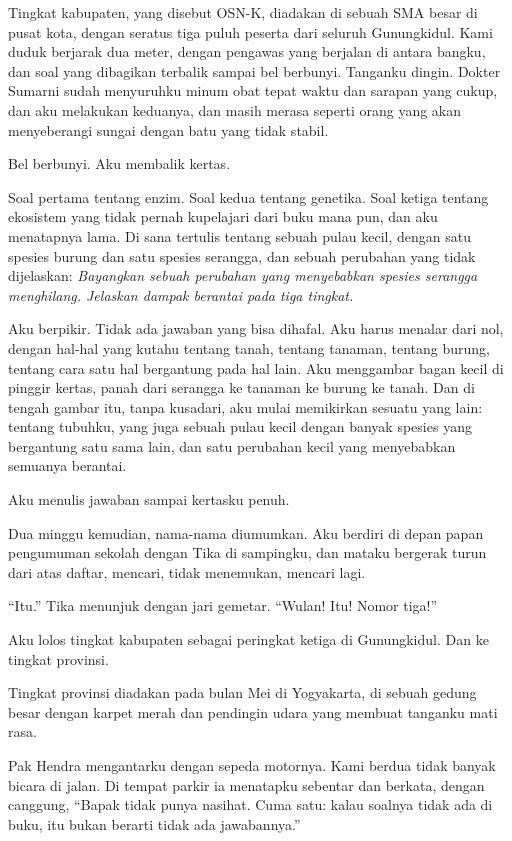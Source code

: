 \documentclass[11pt,twoside,openany]{book}
\makeatletter
\newcommand{\scenebreak}{\par\vspace{0.9em}{\centering\textsc{*\hspace{0.7em}*\hspace{0.7em}*}\par}\vspace{0.9em}\@afterindentfalse\@afterheading}
\makeatother
\begin{document}
Tingkat kabupaten, yang disebut OSN-K, diadakan di sebuah SMA besar di pusat kota, dengan seratus tiga puluh peserta dari seluruh Gunungkidul. Kami duduk berjarak dua meter, dengan pengawas yang berjalan di antara bangku, dan soal yang dibagikan terbalik sampai bel berbunyi. Tanganku dingin. Dokter Sumarni sudah menyuruhku minum obat tepat waktu dan sarapan yang cukup, dan aku melakukan keduanya, dan masih merasa seperti orang yang akan menyeberangi sungai dengan batu yang tidak stabil.

Bel berbunyi. Aku membalik kertas.

Soal pertama tentang enzim. Soal kedua tentang genetika. Soal ketiga tentang ekosistem yang tidak pernah kupelajari dari buku mana pun, dan aku menatapnya lama. Di sana tertulis tentang sebuah pulau kecil, dengan satu spesies burung dan satu spesies serangga, dan sebuah perubahan yang tidak dijelaskan: \emph{Bayangkan sebuah perubahan yang menyebabkan spesies serangga menghilang. Jelaskan dampak berantai pada tiga tingkat.}

Aku berpikir. Tidak ada jawaban yang bisa dihafal. Aku harus menalar dari nol, dengan hal-hal yang kutahu tentang tanah, tentang tanaman, tentang burung, tentang cara satu hal bergantung pada hal lain. Aku menggambar bagan kecil di pinggir kertas, panah dari serangga ke tanaman ke burung ke tanah. Dan di tengah gambar itu, tanpa kusadari, aku mulai memikirkan sesuatu yang lain: tentang tubuhku, yang juga sebuah pulau kecil dengan banyak spesies yang bergantung satu sama lain, dan satu perubahan kecil yang menyebabkan semuanya berantai.

Aku menulis jawaban sampai kertasku penuh.

Dua minggu kemudian, nama-nama diumumkan. Aku berdiri di depan papan pengumuman sekolah dengan Tika di sampingku, dan mataku bergerak turun dari atas daftar, mencari, tidak menemukan, mencari lagi.

``Itu.'' Tika menunjuk dengan jari gemetar. ``Wulan! Itu! Nomor tiga!''

Aku lolos tingkat kabupaten sebagai peringkat ketiga di Gunungkidul. Dan ke tingkat provinsi.

\scenebreak
Tingkat provinsi diadakan pada bulan Mei di Yogyakarta, di sebuah gedung besar dengan karpet merah dan pendingin udara yang membuat tanganku mati rasa.

Pak Hendra mengantarku dengan sepeda motornya. Kami berdua tidak banyak bicara di jalan. Di tempat parkir ia menatapku sebentar dan berkata, dengan canggung, ``Bapak tidak punya nasihat. Cuma satu: kalau soalnya tidak ada di buku, itu bukan berarti tidak ada jawabannya.''
\end{document}
